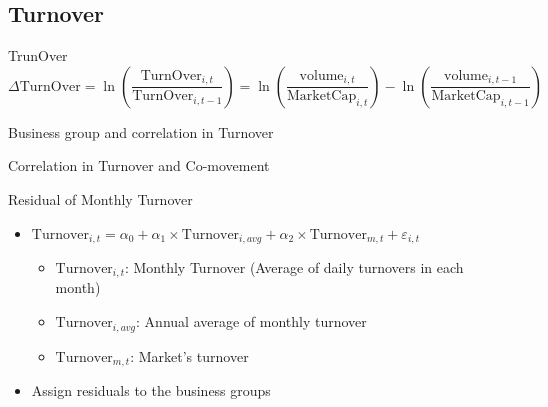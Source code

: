 \documentclass[handout]{beamer}
\begin{document}
 \subsection{Turnover}
	\begin{frame}{TrunOver}{\cite{Liquidity2016}}
		\begin{equation*}
			\Delta \text{TurnOver} = \ln(\frac{\text{TurnOver}_{i,t}}{\text{TurnOver}_{i,t-1}}) = 
			\ln({\frac{\text{volume}_{i,t}}{\text{MarketCap}_{i,t}}}) - \ln({\frac{\text{volume}_{i,t-1}}{\text{MarketCap}_{i,t-1}}})
		\end{equation*}


	\begin{table}[htbp]
		\centering
		\resizebox{0.55\textwidth}{!}{
			
		}
	\end{table}
	
\end{frame}


\begin{frame}{Business group and correlation in Turnover}
	\begin{table}[htbp]
		\centering
		\resizebox{\textwidth}{!}{
			\centering
			
		}
	\end{table}
\end{frame}

\begin{frame}{Correlation in Turnover and Co-movement}
\begin{table}[htbp]
	\centering
	\resizebox{0.9\textwidth}{!}{
		\centering
		
	}
\end{table}
\end{frame}

\begin{frame}{Residual of Monthly Turnover}
\begin{itemize}
\item $ \text{Turnover}_{i,t} = \alpha_0 +\alpha_1 \times \text{Turnover}_{i,avg} +\alpha_2 \times \text{Turnover}_{m,t} + \boxed{\varepsilon_{i,t}} $
\begin{itemize}\scriptsize
\item $ \text{Turnover}_{i,t}$: Monthly Turnover (Average of daily turnovers in each month)
\item $ \text{Turnover}_{i,avg}$: Annual average of monthly turnover
\item $ \text{Turnover}_{m,t}$: Market's turnover 

\end{itemize}
\item Assign residuals to the business groups
\bigskip

	\begin{table}[htbp]
		\centering
		\resizebox{0.75\textwidth}{!}{
			
		}
		\label{tab:ResidualTrunSummary}
	\end{table}
\end{itemize}
\end{frame}
\end{document}
